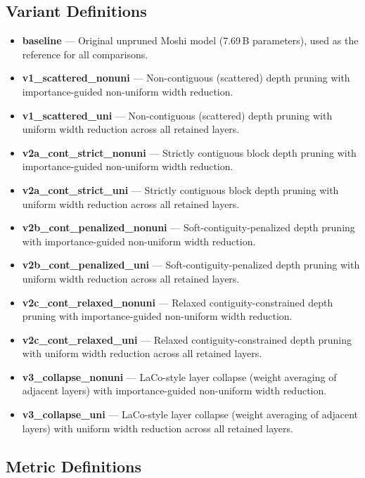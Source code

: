 \documentclass[11pt,a4paper]{article}
\begin{document}
\subsection{Variant Definitions}

\begin{itemize}[leftmargin=1.5em, itemsep=2pt]
  \item \textbf{baseline} — Original unpruned Moshi model (7.69\,B parameters), used as the reference for all comparisons.
  \item \textbf{v1\_scattered\_nonuni} — Non-contiguous (scattered) depth pruning with importance-guided non-uniform width reduction.
  \item \textbf{v1\_scattered\_uni} — Non-contiguous (scattered) depth pruning with uniform width reduction across all retained layers.
  \item \textbf{v2a\_cont\_strict\_nonuni} — Strictly contiguous block depth pruning with importance-guided non-uniform width reduction.
  \item \textbf{v2a\_cont\_strict\_uni} — Strictly contiguous block depth pruning with uniform width reduction across all retained layers.
  \item \textbf{v2b\_cont\_penalized\_nonuni} — Soft-contiguity-penalized depth pruning with importance-guided non-uniform width reduction.
  \item \textbf{v2b\_cont\_penalized\_uni} — Soft-contiguity-penalized depth pruning with uniform width reduction across all retained layers.
  \item \textbf{v2c\_cont\_relaxed\_nonuni} — Relaxed contiguity-constrained depth pruning with importance-guided non-uniform width reduction.
  \item \textbf{v2c\_cont\_relaxed\_uni} — Relaxed contiguity-constrained depth pruning with uniform width reduction across all retained layers.
  \item \textbf{v3\_collapse\_nonuni} — LaCo-style layer collapse (weight averaging of adjacent layers) with importance-guided non-uniform width reduction.
  \item \textbf{v3\_collapse\_uni} — LaCo-style layer collapse (weight averaging of adjacent layers) with uniform width reduction across all retained layers.
\end{itemize}

\subsection{Metric Definitions}
\end{document}
